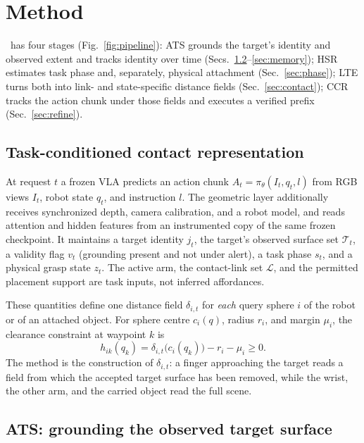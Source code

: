\section{Method}
\label{sec:method}
\sys\ has four stages (Fig.~\ref{fig:pipeline}): ATS grounds the target's identity and observed extent and tracks identity over time (Secs.~\ref{sec:grounding}--\ref{sec:memory}); HSR estimates task phase and, separately, physical attachment (Sec.~\ref{sec:phase}); LTE turns both into link- and state-specific distance fields (Sec.~\ref{sec:contact}); CCR tracks the action chunk under those fields and executes a verified prefix (Sec.~\ref{sec:refine}).

\subsection{Task-conditioned contact representation}
\label{sec:overview}
At request $t$ a frozen VLA predicts an action chunk $A_t=\pi_\theta(I_t,q_t,l)$ from RGB views $I_t$, robot state $q_t$, and instruction $l$. The geometric layer additionally receives synchronized depth, camera calibration, and a robot model, and reads attention and hidden features from an instrumented copy of the same frozen checkpoint. It maintains a target identity $j_t$, the target's observed surface set $\mathcal T_t$, a validity flag $v_t$ (grounding present and not under alert), a task phase $s_t$, and a physical grasp state $z_t$. The active arm, the contact-link set $\mathcal L$, and the permitted placement support are task inputs, not inferred affordances.

These quantities define one distance field $\delta_{i,t}$ for \emph{each} query sphere $i$ of the robot or of an attached object. For sphere centre $c_i(q)$, radius $r_i$, and margin $\mu_i$, the clearance constraint at waypoint $k$ is
\begin{equation}
 h_{ik}(q_k)=\delta_{i,t}\big(c_i(q_k)\big)-r_i-\mu_i\geq0.
 \label{eq:clearance}
\end{equation}
The method is the construction of $\delta_{i,t}$: a finger approaching the target reads a field from which the accepted target surface has been removed, while the wrist, the other arm, and the carried object read the full scene.

\subsection{ATS: grounding the observed target surface}
\label{sec:grounding}
